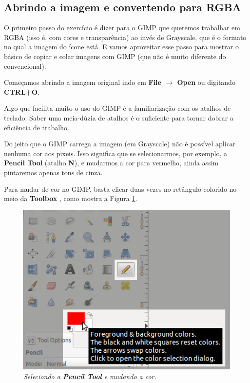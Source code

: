 \documentclass[12pt,onecolumn]{article}
\begin{document}
  \subsection{Abrindo a imagem e convertendo para RGBA}
    O primeiro passo do exercício é dizer para o GIMP que queremos trabalhar em
    RGBA (isso é, com cores e transparência) ao invés de Grayscale, que é o
    formato no qual a imagem do ícone está. E vamos aproveitar esse passo para
    mostrar o básico de copiar e colar imagens com GIMP (que não é muito
    diferente do convencional).
    
    Começamos abrindo a imagem original indo em {\bf File $\rightarrow$ Open}
    ou digitando {\bf CTRL+O}.
    
    \begin{framed}
      Algo que facilita muito o uso do GIMP é a familiarização com os atalhos
      de teclado. Saber uma meia-dúzia de atalhos é o suficiente para tornar
      dobrar a eficiência de trabalho. 
    \end{framed}
    
    Do jeito que o GIMP carrega a imagem (em Grayscale) não é possível aplicar
    nenhuma cor aos pixeis. Isso significa que se selecionarmos, por exemplo,
    a {\bf Pencil Tool} (atalho {\bf N}), e mudarmos a cor para vermelho, ainda
    assim pintaremos apenas tons de cinza.
    
    \begin{framed}
      Para mudar de cor no GIMP, basta clicar duas vezes no retângulo colorido
      no meio da {\bf Toolbox }, como mostra a Figura \ref{fig:pencil_and_color}.
    \end{framed}
    
    \begin{figure}[ht]
      \centering
      \includegraphics[width=.6\textwidth]{screenshots/00-pencil_and_color.png}
      \caption{
        \footnotesize
        \it
        Seleciondo a {\bf Pencil Tool} e mudando a cor.
      }
      \label{fig:pencil_and_color}
    \end{figure}
    
\end{document}
